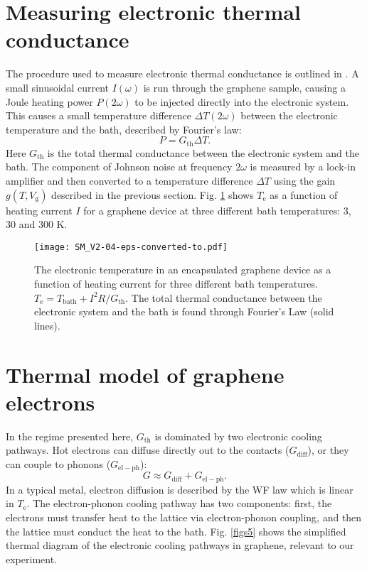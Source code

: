 \documentclass[10pt, oneside]{book}
\begin{document}
\begin{doublespace}
\begin{appendix}
\section{Measuring electronic thermal conductance}

The procedure used to measure electronic thermal conductance is outlined in \cite{crossno2, fong, prober}.  A small sinusoidal current $I(\omega)$ is run through the graphene sample, causing a Joule heating power $P(2\omega)$ to be injected directly into the electronic system.  This causes a small temperature difference $\Delta T(2\omega) $ between the electronic temperature and the bath, described by Fourier's law: \begin{equation}
P = G_{\mathrm{th}} \Delta T.   \label{eqp1}
\end{equation}
Here $G_{\mathrm{th}}$ is the total thermal conductance between the electronic system and the bath.  The component of Johnson noise at frequency $2\omega$  is measured by a lock-in amplifier and then converted to a temperature difference $\Delta T$ using the gain $g(T,V_{\mathrm{g}})$ described in the previous section.  Fig. \ref{figs4} shows $T_{\mathrm{e}}$ as a function of heating current $I$ for a graphene device at three different bath temperatures:  3, 30 and 300 K.

 \begin{figure}
 \centering
\texttt{[image: SM\_V2-04-eps-converted-to.pdf]}
\caption{The electronic temperature in an encapsulated graphene device as a function of heating current for three different bath temperatures.  $T_{\mathrm{e}}=T_{\mathrm{bath}}+I^2R/G_{\mathrm{th}}$.  The total thermal conductance between the electronic system and the bath is found through Fourier's Law (solid lines).}
\label{figs4}
\end{figure}

\section{Thermal model of graphene electrons}\label{s6sec}
In the regime presented here, $G_{\mathrm{th}}$ is dominated by two electronic cooling pathways.  Hot electrons can diffuse directly out to the contacts ($G_{\mathrm{diff}}$), or they can couple to phonons ($G_{\mathrm{el-ph}}$):  \begin{equation}
G \approx G_{\mathrm{diff}} + G_{\mathrm{el-ph}}.
\end{equation}
In a typical metal, electron diffusion is described by the WF law which is linear in $T_{\mathrm{e}}$. The electron-phonon cooling pathway has two components:  first, the electrons must transfer heat to the lattice via electron-phonon coupling, and then the lattice must conduct the heat to the bath. Fig. \ref{figs5} shows the simplified thermal diagram of the electronic cooling pathways in graphene, relevant to our experiment.


\end{appendix}
\end{doublespace}
\end{document}
